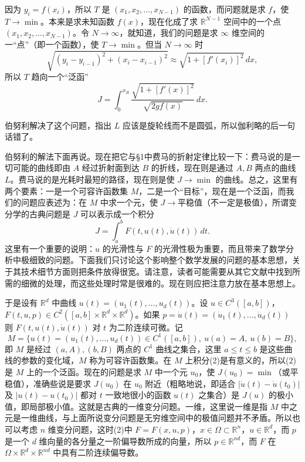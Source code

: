 因为 $y_i=f(x_i)$，所以 $T$ 是 $(x_1,x_2,\ldots,x_{N-1})$ 的函数，而问题就是求 $f$，使 $T\to\min$。本来是求未知函数 $f(x)$，现在化成了求 $\mathbb R^{N-1}$ 空间中的一个点 $(x_1,x_2,\ldots,x_{N-1})$。令 $N\to\infty$，就知道，我们的问题是求 $\infty$ 维空间的一“点”（即一个函数），使 $T\to\min$。但当 $N\to\infty$ 时
\[
 \sqrt{(y_i-y_{i-1})^2+(x_i-x_{i-1})^2}
 \approx\sqrt{1+[f'(x_i)]^2}\,dx,
\]
所以 $T$ 趋向一个“泛函”
\begin{equation}
 J=\int_0^{x_B}\frac{\sqrt{1+[f'(x)]^2}}{\sqrt{2gf(x)}}\,dx.
 \tag{1}
\end{equation}

伯努利解决了这个问题，指出 $L$ 应该是旋轮线而不是圆弧，所以伽利略的后一句话错了。

伯努利的解法下面再说。现在把它与§1中费马的折射定律比较一下：费马说的是一切可能的曲线即由 $A$ 经过折射面到达 $B$ 的折线，现在则是通过 $A,B$ 两点的曲线 $L$。费马说的是光耗时最短的路径，现在则是使 $J\to\min$ 的曲线。总之，这里有两个要素：一是一个可容许函数集 $M$，二是一个“目标”，现在是一个泛函，而我们的问题应表述为：在 $M$ 中求一个元，使 $J\to$平稳值（不一定是极值），所谓变分学的古典问题是 $J$ 可以表示成一个积分
\begin{equation}
 J=\int_a^b F(t,u(t),\dot u(t))\,dt.
 \tag{2}
\end{equation}
这里有一个重要的说明：$u$ 的光滑性与 $F$ 的光滑性极为重要，而且带来了数学分析中极细致的问题。下面我们只讨论这个影响整个数学发展的问题的基本思想，关于其技术细节方面则把条件放得很宽。请注意，读者可能需要从其它文献中找到所需的细微的处理，而这些处理时常是很难的。现在则应把注意力放在基本思想上。

于是设有 $\mathbb R^d$ 中曲线 $u(t)=(u_1(t),\ldots,u_d(t))$。设 $u\in C^3([a,b])$，$F(t,u,p)\in C^2([a,b]\times\mathbb R^d\times\mathbb R^d)$。如果 $p=\dot u(t)=(\dot u_1(t),\ldots,\dot u_d(t))$ 则 $F(t,u(t),\dot u(t))$ 对 $t$ 为二阶连续可微。记
\[
 M=\{u(t)=(u_1(t),\ldots,u_d(t))\in C^1([a,b]),\ u(a)=A,\ u(b)=B\},
\]
即 $M$ 是经过 $(a,A),(b,B)$ 两点的 $C^1$ 曲线之集合，这里 $a\le t\le b$ 是这些曲线的参数的变化域，$M$ 称为可容许函数集。在 $M$ 上积分(2)是有意义的，所以(2)是 $M$ 上的一个泛函。现在的问题是求 $M$ 中一个元 $u_0$，使 $J(u_0)=\min$（或平稳值），准确些说是要求 $J(u_0)$ 在 $u_0$ 附近（粗略地说，即适合 $|\dot u(t)-\dot u(t_0)|$ 及 $|u(t)-u(t_0)|$ 都对 $t$ 一致地很小的函数 $u(t)$ 之集合）是 $J(u)$ 的极小值，即局部极小值。这就是古典的一维变分问题。一维，这里说一维是指 $M$ 中之元是一维曲线，与上面所说变分问题是无穷维空间中的极值问题并不矛盾。所以也可以考虑 $n$ 维变分问题，这时(2)中 $F=F(x,u,p)$，$x\in\Omega\subset\mathbb R^n$，$u\in\mathbb R^d$，而 $p$ 是一个 $d$ 维向量的各分量之一阶偏导数所成的向量，所以 $p\in\mathbb R^{nd}$，而 $F$ 在 $\Omega\times\mathbb R^d\times\mathbb R^{nd}$ 中具有二阶连续偏导数。

